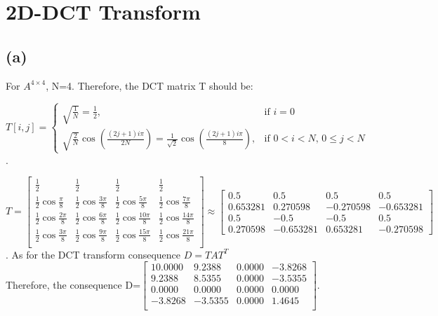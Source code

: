 \documentclass{article}
\begin{document}
\section{2D-DCT Transform}

\subsection*{(a)} For $A^{4\times4}$, N=4. Therefore, the DCT matrix T should be:  

$ T[i,j]=
\begin{cases}
  \sqrt{\frac{1}{N}} = \frac{1}{2}, & \text{if } i=0 \\[1em]
  \sqrt{\frac{2}{N}} \cos\left(\frac{(2j+1)i\pi}{2N}\right)
= \frac{1}{\sqrt{2}} \cos\left(\frac{(2j+1)i\pi}{8}\right), & 
\text{if } 0<i<N,\, 0 \le j < N
\end{cases}
$\\. 

$
T=\begin{bmatrix}
    \frac{1}{2} & \frac{1}{2} & \frac{1}{2} & \frac{1}{2} \\
    \frac{1}{2}\cos\frac{\pi}{8} & \frac{1}{2}\cos\frac{3\pi}{8} & \frac{1}{2}\cos\frac{5\pi}{8} & \frac{1}{2}\cos\frac{7\pi}{8} \\
    \frac{1}{2}\cos\frac{2\pi}{8} & \frac{1}{2}\cos\frac{6\pi}{8} & \frac{1}{2}\cos\frac{10\pi}{8} & \frac{1}{2}\cos\frac{14\pi}{8} \\
    \frac{1}{2}\cos\frac{3\pi}{8} & \frac{1}{2}\cos\frac{9\pi}{8} & \frac{1}{2}\cos\frac{15\pi}{8} & \frac{1}{2}\cos\frac{21\pi}{8} \\
\end{bmatrix}\approx\begin{bmatrix}
    0.5 & 0.5 & 0.5 & 0.5\\
    0.653281 & 0.270598 & -0.270598 & -0.653281\\
    0.5 & -0.5 & -0.5 & 0.5\\
    0.270598 & -0.653281 & 0.653281 & -0.270598
\end{bmatrix}
$. 
As for the DCT transform consequence $D=TAT^{T}$\\
Therefore, the consequence D=$\begin{bmatrix}
10.0000 & 9.2388 & 0.0000 & -3.8268\\
9.2388 & 8.5355 & 0.0000 & -3.5355\\
0.0000 & 0.0000 & 0.0000 & 0.0000\\
-3.8268 & -3.5355 & 0.0000 & 1.4645\\
\end{bmatrix}$. 
\end{document}
